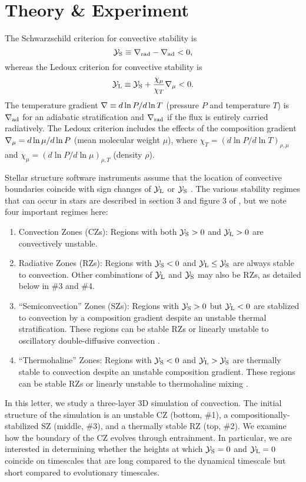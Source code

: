 \section{Theory \& Experiment}
\label{sec:theory}
The Schwarzschild criterion for convective stability is
\begin{equation}
    \yS \equiv \gradrad - \gradad < 0,
    \label{eqn:yS}
\end{equation}
whereas the Ledoux criterion for convective stability is
\begin{equation}
    \yL \equiv \yS +  \frac{\chi_\mu}{\chi_T}\gradmu < 0.
    \label{eqn:yL}
\end{equation}
The temperature gradient $\nabla \equiv d \ln P / d \ln T$ (pressure $P$ and temperature $T$) is $\nabla_{\rm{ad}}$ for an adiabatic stratification and $\nabla_{\rm{rad}}$ if the flux is entirely carried radiatively.
The Ledoux criterion includes the effects of the composition gradient $\nabla_{\mu} = d\ln\mu/d\ln P$ (mean molecular weight $\mu$), where $\chi_T = (d\ln P / d\ln T)_{\rho,\mu}$ and $\chi_\mu = (d\ln P / d\ln\mu)_{\rho,T}$ (density $\rho$).

Stellar structure software instruments assume that the location of convective boundaries coincide with sign changes of $\mathcal{Y}_{\rm{L}}$ or $\mathcal{Y}_{\rm{S}}$ \citep[][sec.~2]{mesa4}.
The various stability regimes that can occur in stars are described in section 3 and figure 3 of \citet{salaris_cassisi_2017}, but we note four important regimes here:
\begin{enumerate}
    \item Convection Zones (CZs): Regions with both $\mathcal{Y}_{\rm{S}} > 0$ and $\mathcal{Y}_{\rm{L}} > 0$ are convectively unstable.
    \item Radiative Zones (RZs): Regions with $\mathcal{Y}_{\rm{S}} < 0$ and $\mathcal{Y}_{\rm{L}} \leq \mathcal{Y}_{\rm{S}}$ are always stable to convection.
        Other combinations of $\mathcal{Y}_{\rm{L}}$ and $\mathcal{Y}_{\rm{S}}$ may also be RZs, as detailed below in \#3 and \#4.
    \item ``Semiconvection'' Zones (SZs): Regions with $\mathcal{Y}_{\rm{S}} > 0$ but $\mathcal{Y}_{\rm{L}} < 0$ are stablized to convection by a composition gradient despite an unstable thermal stratification.
        These regions can be stable RZs or linearly unstable to oscillatory double-diffusive convection \citep[ODDC, see][chapters 2 and 4]{garaud_2018}.
    \item ``Thermohaline'' Zones: Regions with $\mathcal{Y}_{\rm{S}} < 0$ and $\mathcal{Y}_{\rm{L}} > \mathcal{Y}_{\rm{S}}$ are thermally stable to convection despite an unstable composition gradient.
        These regions can be stable RZs or linearly unstable to thermohaline mixing \citep[see][chapters 2 and 3]{garaud_2018}.
\end{enumerate}
In this letter, we study a three-layer 3D simulation of convection.
The initial structure of the simulation is an unstable CZ (bottom, \#1), a compositionally-stabilized SZ (middle, \#3), and a thermally stable RZ (top, \#2).
We examine how the boundary of the CZ evolves through entrainment.
In particular, we are interested in determining whether the heights at which $\mathcal{Y}_{\rm{S}} = 0$ and $\mathcal{Y}_{\rm{L}} = 0$ coincide on timescales that are long compared to the dynamical timescale but short compared to evolutionary timescales.

